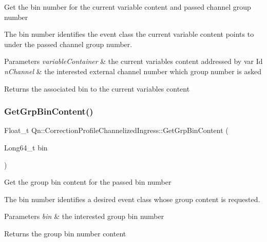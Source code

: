 Get the bin number for the current variable content and passed channel group number

The bin number identifies the event class the current variable content points to under the passed channel group number.


\begin{DoxyParams}{Parameters}
{\em variable\+Container} & the current variables content addressed by var Id \\
\hline
{\em n\+Channel} & the interested external channel number which group number is asked \\
\hline
\end{DoxyParams}
\begin{DoxyReturn}{Returns}
the associated bin to the current variables content 
\end{DoxyReturn}
\mbox{\label{classQn_1_1CorrectionProfileChannelizedIngress_ae150d82ad7a8b0cdc830dd41b46296ed}} 
\subsubsection{\texorpdfstring{Get\+Grp\+Bin\+Content()}{GetGrpBinContent()}}
{\footnotesize\ttfamily Float\+\_\+t Qn\+::\+Correction\+Profile\+Channelized\+Ingress\+::\+Get\+Grp\+Bin\+Content (\begin{DoxyParamCaption}\item[{Long64\+\_\+t}]{bin }\end{DoxyParamCaption})\hspace{0.3cm}{\ttfamily [virtual]}}

Get the group bin content for the passed bin number

The bin number identifies a desired event class whose group content is requested.


\begin{DoxyParams}{Parameters}
{\em bin} & the interested group bin number \\
\hline
\end{DoxyParams}
\begin{DoxyReturn}{Returns}
the group bin number content 
\end{DoxyReturn}
\mbox{\label{classQn_1_1CorrectionProfileChannelizedIngress_acc740b3b8325d5e0604a1826edbf6085}} 
